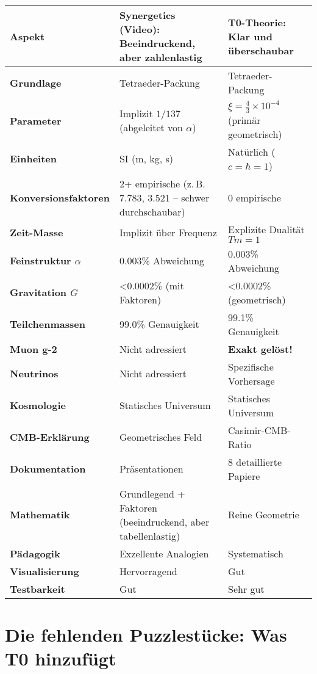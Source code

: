 \documentclass[12pt,a4paper]{article}
\newcommand{\xipar}{\xi}
\begin{document}
	\begin{center}
		\sloppy
		\begin{tabular}{p{4cm}p{5cm}p{5cm}}
			\toprule
			\textbf{Aspekt} & \textbf{Synergetics (Video): Beeindruckend, aber zahlenlastig} & \textbf{T0-Theorie: Klar und überschaubar} \\
			\midrule
			\textbf{Grundlage} & Tetraeder-Packung & Tetraeder-Packung \\
			\textbf{Parameter} & Implizit $1/137$ (abgeleitet von $\alpha$) & $\xipar = \frac{4}{3} \times 10^{-4}$ (primär geometrisch) \\
			\textbf{Einheiten} & SI (m, kg, s) & Natürlich ($c=\hbar=1$) \\
			\textbf{Konversionsfaktoren} & 2+ empirische (z.\,B. 7.783, 3.521 – schwer durchschaubar) & 0 empirische \\
			\textbf{Zeit-Masse} & Implizit über Frequenz & Explizite Dualität $Tm=1$ \\
			\textbf{Feinstruktur $\alpha$} & 0.003\% Abweichung & 0.003\% Abweichung \\
			\textbf{Gravitation $G$} & <0.0002\% (mit Faktoren) & <0.0002\% (geometrisch) \\
			\textbf{Teilchenmassen} & 99.0\% Genauigkeit & 99.1\% Genauigkeit \\
			\textbf{Muon g-2} & Nicht adressiert & \textbf{Exakt gelöst!} \\
			\textbf{Neutrinos} & Nicht adressiert & Spezifische Vorhersage \\
			\textbf{Kosmologie} & Statisches Universum & Statisches Universum \\
			\textbf{CMB-Erklärung} & Geometrisches Feld & Casimir-CMB-Ratio \\
			\textbf{Dokumentation} & Präsentationen & 8 detaillierte Papiere \\
			\textbf{Mathematik} & Grundlegend + Faktoren (beeindruckend, aber tabellenlastig) & Reine Geometrie \\
			\textbf{Pädagogik} & Exzellente Analogien & Systematisch \\
			\textbf{Visualisierung} & Hervorragend & Gut \\
			\textbf{Testbarkeit} & Gut & Sehr gut \\
			\bottomrule
		\end{tabular}
	\end{center}
	
	\section{Die fehlenden Puzzlestücke: Was T0 hinzufügt}
	
\end{document}
